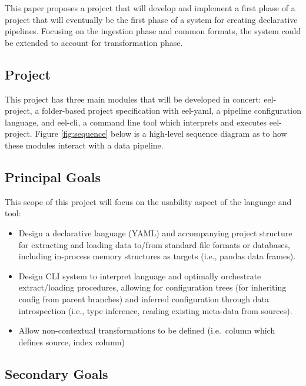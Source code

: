 This paper proposes a project that will develop and implement a first
phase of a project that will eventually be the first phase of a system
for creating declarative pipelines. Focusing on the ingestion phase and
common formats, the system could be extended to account for
transformation phase.

\subsection{Project}\label{project}

This project has three main modules that will be developed in concert:
eel-project, a folder-based project specification with eel-yaml, a
pipeline configuration language, and eel-cli, a command line tool which
interprets and executes eel-project. Figure \ref{fig:sequence} below is
a high-level sequence diagram as to how these modules interact with a
data pipeline.



\subsection{Principal Goals}\label{principal-goals}

This scope of this project will focus on the usability aspect of the
language and tool:

\begin{itemize}
\item
  Design a declarative language (YAML) and accompanying project
  structure for extracting and loading data to/from standard file
  formats or databases, including in-process memory structures as
  targets (i.e., pandas data frames).
\item
  Design CLI system to interpret language and optimally orchestrate
  extract/loading procedures, allowing for configuration trees (for
  inheriting config from parent branches) and inferred configuration
  through data introspection (i.e., type inference, reading existing
  meta-data from sources).
\item
  Allow non-contextual transformations to be defined (i.e.~column which
  defines source, index column)
\end{itemize}

\subsection{Secondary Goals}\label{secondary-goals}

